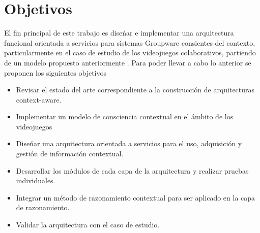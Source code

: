 \section{Objetivos}
El fin principal de este trabajo es dise\'nar e implementar una arquitectura funcional orientada a servicios para sistemas Groupware consientes del contexto, particularmente en el caso de estudio de los videojuegos colaborativos, partiendo de un modelo propuesto anteriormente \cite{montane2013context}. Para poder llevar a cabo lo anterior se proponen los siguientes objetivos
\begin{itemize}
\item Revisar el estado del arte correspondiente a la construcci\'on de arquitecturas context-aware.
\item Implementar un modelo de consciencia contextual en el \'ambito de los videojuegos
\item Dise\'nar una arquitectura orientada a servicios para el uso, adquisici\'on y gesti\'on de informaci\'on contextual.
\item Desarrollar los m\'odulos de cada capa de la arquitectura y realizar pruebas individuales.
\item Integrar un m\'etodo de razonamiento contextual para ser aplicado en la capa de razonamiento.
\item Validar la arquitectura con el caso de estudio.
\end{itemize}